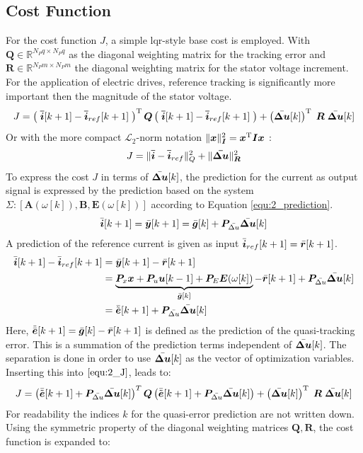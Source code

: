 \subsection{Cost Function}
For the cost function $J$, a simple \acrshort{lqr}-style base cost is employed. With $\bm{Q} \in \mathbb{R}^{N_P q\times N_P q}$ as the diagonal weighting matrix for the tracking error and $\bm{R} \in \mathbb{R}^{N_P m\times N_P m} $ the diagonal weighting matrix  for the stator voltage increment. For the application of electric drives, reference tracking is significantly more important then the magnitude of the stator voltage.
\begin{equation*}
J = \left(\; \bm{\Bar{i}} [k+1] - \boldsymbol{\Bar{i}}_{ref} [k+1] \; \right)^{\mathrm{T}} \boldsymbol{Q} \left(\; \boldsymbol{\Bar{i}} [k+1] - \boldsymbol{\Bar{i}}_{ref} [k+1]\; \right) + \left(\Bar{\bm{\Delta u}}[k] \right)^{\mathrm{T}} \; \boldsymbol{R} \; \Bar{\bm{\Delta u}}[k]
\end{equation*}
Or with the more compact $\mathcal{L}_2$-norm notation $\| \bm{{x}} \|_{\bm{I}}^2 = {\bm{x}}^{\mathrm{T}} \bm{I} {\bm{x}}$  :
\begin{equation}
	J = \| \bm{\Bar{i}}  - \bm{\Bar{i}}_{ref} \|_{Q}^2  + \| \bm{{\Bar{\boldsymbol{\Delta u}}}} \|_{\bm{R}}^2
	\label{equ:2_J}
\end{equation}
To express the cost $J$ in terms of $\Bar{\bm{\Delta u}}[k]$, the prediction for the current as output signal is expressed by the prediction based on the system $\Sigma: \left[\bm{A}(\omega[k]),\bm{B},\bm{E}(\omega[k])\right]$ according to Equation \eqref{equ:2_prediction}. 
\[
\Bar{\bm{i}}[k+1]  = \Bar{\bm{y}}[k+1] = \Bar{\bm{g}}[k] + \bm{P}_{\Bar{\Delta u}} \Bar{\bm{\Delta u}}[k]
\]
A prediction of the reference current is given as input $ \Bar{\bm i}_{ref} [k+1] = \Bar{\bm r} [k+1]$.
\begin{align*}
	\Bar{\bm{i}}[k+1] - \Bar{\bm{i}}_{ref}[k+1]
	&= \Bar{\bm{y}}[k+1] - \Bar{\bm{r}}[k+1] \\
	&= \underbrace{\bm{P}_x {\bm{x}} + \bm{P}_u \bm{u}[k-1] + \bm{P}_E \bm{E}(\omega[k])}_{\Bar{\bm{g}}[k]}
	- \Bar{\bm{r}}[k+1] + \bm{P}_{\Bar{\Delta u}} \Bar{\bm{\Delta u}}[k] \\
	&= \Bar{\Tilde{\bm{e}}}[k+1] + \bm{P}_{\Bar{\Delta u}} \Bar{\bm{\Delta u}}[k]
\end{align*}
Here, $\Tilde{\Bar{\bm{e}}}[k+1] = \Bar{\bm{g}}[k] - \Bar{\bm{r}}[k+1]$ is defined as the prediction of the quasi-tracking error. This is a summation of the prediction terms independent of $\Bar{\bm{\Delta u}}[k]$. The separation is done in order to use $\Bar{\bm{\Delta u}}[k]$ as the vector of optimization variables. Inserting this into $\eqref{equ:2_J}$, leads to:
\[
J = \left(\Bar{\Tilde{\bm{e}}}[k+1] + \bm{P}_{\Bar{\Delta u}} \Bar{\bm{\Delta u}}[k] \right)^T \bm{Q} \left(\Bar{\Tilde{\bm{e}}}[k+1] + \bm{P}_{\Bar{\Delta u}} \Bar{\bm{\Delta u}}[k]\right) +  \left(\Bar{\bm{\Delta u}}[k] \right)^{\mathrm{T}} \; \boldsymbol{R} \; \Bar{\bm{\Delta u}}[k]
\]
For readability the indices $k$ for the quasi-error prediction are not written down. Using the symmetric property of the diagonal weighting matrices $\bm{Q,R}$, the cost function is expanded to:

